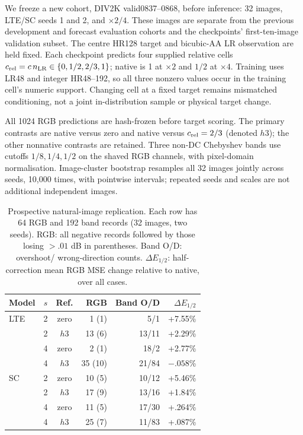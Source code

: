 We freeze a new cohort, DIV2K valid0837--0868, before inference: 32 images,
LTE/SC seeds 1 and 2, and $\times2/4$. These images are separate from the
previous development and forecast evaluation cohorts and the checkpoints'
first-ten-image validation subset. The centre HR128 target and bicubic-AA
LR observation are held fixed. Each checkpoint predicts four supplied
relative cells $c_{\rm rel}=c\,n_{\rm LR}\in\{0,1/2,2/3,1\}$; native
is 1 at $\times2$ and $1/2$ at $\times4$. Training uses LR48 and integer
HR48--192, so all three nonzero values occur in the training cell's
numeric support. Changing cell at a fixed target remains mismatched
conditioning, not a joint in-distribution sample or physical target change.

All 1024 RGB predictions are hash-frozen before target scoring. The primary
contrasts are native versus zero and native versus $c_{\rm rel}=2/3$
(denoted $h3$); the other nonnative contrasts are retained. Three non-DC
Chebyshev bands use cutoffs $1/8,1/4,1/2$ on the shaved RGB channels,
with pixel-domain normalisation. Image-cluster bootstrap resamples all
32 images jointly across seeds, 10,000 times, with pointwise intervals;
repeated seeds and scales are not additional independent images.

\begin{table}[t]\centering
\caption{Prospective natural-image replication. Each row has 64 RGB and
192 band records (32 images, two seeds). RGB: all negative records
followed by those losing $>.01$ dB in parentheses. Band O/D: overshoot/
wrong-direction counts. $\Delta E_{1/2}$: half-correction mean RGB MSE
change relative to native, over all cases.}
\label{tab:failures}
\small
\begin{tabular}{lccrrr}\toprule
Model & $s$ & Ref. & RGB & Band O/D & $\Delta E_{1/2}$\\\midrule
LTE & 2 & zero & 1 (1) & 5/1 & +7.55\%\\
 & 2 & $h3$ & 13 (6) & 13/11 & +2.29\%\\
 & 4 & zero & 2 (1) & 18/2 & +2.77\%\\
 & 4 & $h3$ & 35 (10) & 21/84 & $-.058$\%\\\midrule
SC & 2 & zero & 10 (5) & 10/12 & +5.46\%\\
 & 2 & $h3$ & 17 (9) & 13/16 & +1.84\%\\
 & 4 & zero & 11 (5) & 17/30 & +.264\%\\
 & 4 & $h3$ & 25 (7) & 11/83 & +.087\%\\\bottomrule
\end{tabular}
\end{table}

